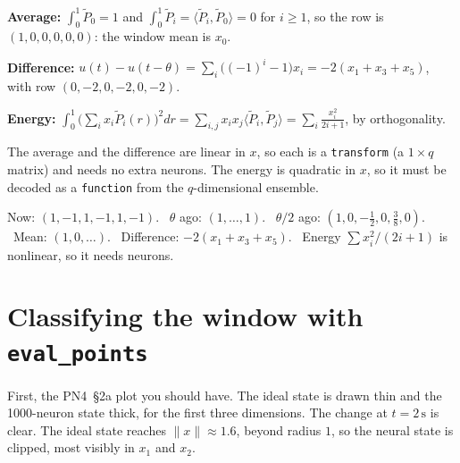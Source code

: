 \documentclass[11pt,letterpaper]{article}
\newcommand{\ans}[1]{\par\vspace{4pt}{\bfseries #1}\quad}
\begin{document}
\ans{Q2}
\textbf{Average:} $\int_0^1 \tilde P_0 = 1$ and $\int_0^1 \tilde P_i = \langle\tilde P_i, \tilde P_0\rangle = 0$ for $i \ge 1$, so the row is $(1, 0, 0, 0, 0, 0)$: the window mean is $x_0$.

\textbf{Difference:} $u(t) - u(t - \theta) = \sum_i\bigl((-1)^i - 1\bigr)x_i = -2(x_1 + x_3 + x_5)$, with row $(0, -2, 0, -2, 0, -2)$.

\textbf{Energy:} $\int_0^1\bigl(\sum_i x_i\tilde P_i(r)\bigr)^2dr = \sum_{i,j} x_ix_j\langle\tilde P_i, \tilde P_j\rangle = \sum_i \frac{x_i^2}{2i + 1}$, by orthogonality.

The average and the difference are linear in $x$, so each is a \texttt{transform} (a $1 \times q$ matrix) and needs no extra neurons. The energy is quadratic in $x$, so it must be decoded as a \texttt{function} from the $q$-dimensional ensemble.
\begin{result}
Now: $(1, -1, 1, -1, 1, -1)$. \ $\theta$ ago: $(1, \dots, 1)$. \ $\theta/2$ ago: $(1, 0, -\tfrac12, 0, \tfrac38, 0)$. \ Mean: $(1, 0, \dots)$. \ Difference: $-2(x_1 + x_3 + x_5)$. \ Energy $\sum x_i^2/(2i + 1)$ is nonlinear, so it needs neurons.
\end{result}

\section{Classifying the window with \texttt{eval\_points}}

First, the PN4~\S2a plot you should have. The ideal state is drawn thin and the 1000-neuron state thick, for the first three dimensions. The change at $t = 2\,\mathrm{s}$ is clear. The ideal state reaches $\|x\| \approx 1.6$, beyond radius $1$, so the neural state is clipped, most visibly in $x_1$ and $x_2$.
\begin{center}
\end{center}
\end{document}

